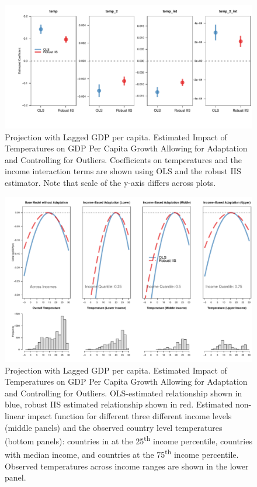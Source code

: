 \documentclass[11pt, letterpaper]{article}
\numberwithin{algorithm}{section}
\numberwithin{assumption}{section}
\numberwithin{lemma}{section}
\numberwithin{theorem}{section}
\numberwithin{corollary}{section}
\numberwithin{remark}{section}
\numberwithin{equation}{section}
\numberwithin{figure}{section}
\numberwithin{table}{section}
\begin{document}
\begin{figure}[!htbp]  %
\centering
\includegraphics[width = \textwidth]{coef.adapt.L1.pdf}
\caption{Projection with Lagged GDP per capita. Estimated Impact of Temperatures on GDP Per Capita Growth Allowing for Adaptation and Controlling for Outliers. Coefficients on temperatures and the income interaction terms are shown using OLS and the robust IIS estimator. Note that scale of the y-axis differs across plots.}
\label{fig_dist_coef_app1}
\end{figure}

\begin{figure}[!htbp]  %
\centering
\includegraphics[width = \textwidth]{eff.adapt.L1.v2.pdf}
\caption{Projection with Lagged GDP per capita. Estimated Impact of Temperatures on GDP Per Capita Growth Allowing for Adaptation and Controlling for Outliers. OLS-estimated relationship shown in blue, robust IIS estimated relationship shown in red. Estimated non-linear impact function for different three different income levels (middle panels) and the observed country level temperatures (bottom panels): countries in at the 25\textsuperscript{th} income percentile, countries with median income, and countries at the 75\textsuperscript{th} income percentile. Observed temperatures across income ranges are shown in the lower panel. }
\label{fig_dist_app1}
\end{figure}
\end{document}

